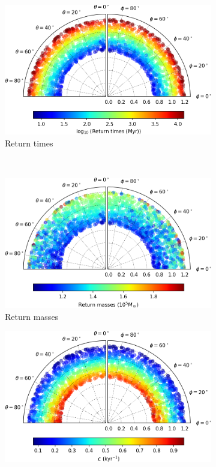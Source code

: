 \begin{figure}[h]
    \centering
    \begin{subfigure}[t]{0.4\textwidth}
        \includegraphics[width = \textwidth]{"../Files/Week 13/images/13_time"}
        \caption{Return times}
    \end{subfigure}
    ~ 
    \begin{subfigure}[t]{0.4\textwidth}
        \includegraphics[width=\textwidth]{"../Files/Week 13/images/13_mass"}
        \caption{Return masses}
    \end{subfigure}
    \begin{subfigure}[t]{0.4\textwidth}
        \includegraphics[width=\textwidth]{"../Files/Week 13/images/13_lyapunov"}

\end{subfigure}
\end{figure}
